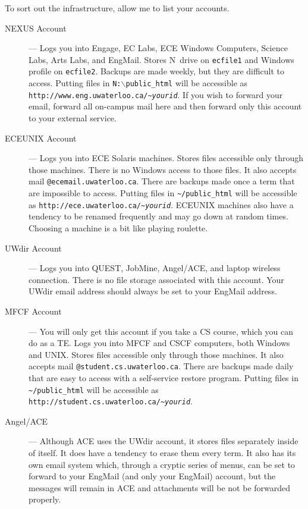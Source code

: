 \documentclass{book}
\begin{document}

To sort out the infrastructure, allow me to list your accounts.

\begin{description}
\item[NEXUS Account] --- Logs you into Engage, EC Labs, ECE Windows Computers, Science Labs, Arts Labs, and EngMail. Stores N~drive on \texttt{ecfile1} and Windows profile on \texttt{ecfile2}. Backups are made weekly, but they are difficult to access. Putting files in \texttt{N:$\backslash$public\_html} will be accessible as \texttt{http://www.\-eng.\-u\-wa\-ter\-loo.\-ca/\-\~{}\textit{yourid}}. If you wish to forward your email, forward all on-campus mail here and then forward only this account to your external service.
\item[ECEUNIX Account] --- Logs you into ECE Solaris machines. Stores files accessible only through those machines. There is no Windows access to those files. It also accepts mail \texttt{@ecemail.\-u\-wa\-ter\-loo.\-ca}. There are backups made once a term that are impossible to access. Putting files in \texttt{\~{}/public\_html} will be accessible as \texttt{http://ece.\-u\-wa\-ter\-loo.\-ca/\-\~{}\textit{yourid}}. ECEUNIX machines also have a tendency to be renamed frequently and may go down at random times. Choosing a machine is a bit like playing roulette.
\item[UWdir Account] --- Logs you into QUEST, JobMine, Angel/ACE, and laptop wireless connection. There is no file storage associated with this account. Your UWdir email address should always be set to your EngMail address.
\item[MFCF Account] --- You will only get this account if you take a CS course, which you can do as a TE. Logs you into MFCF and CSCF computers, both Windows and UNIX. Stores files accessible only through those machines. It also accepts mail \texttt{@student.\-cs.\-u\-wa\-ter\-loo.\-ca}. There are backups made daily that are easy to access with a self-service restore program. Putting files in \texttt{\~{}/public\_html} will be accessible as \texttt{http://student.\-cs\-.u\-wa\-ter\-loo.\-ca/\-\~{}\textit{your\-id}}.
\item[Angel/ACE] --- Although ACE uses the UWdir account, it stores files separately inside of itself. It does have a tendency to erase them every term. It also has its own email system which, through a cryptic series of menus, can be set to forward to your EngMail (and only your EngMail) account, but the messages will remain in ACE and attachments will be not be forwarded properly.

\end{description}
\end{document}
